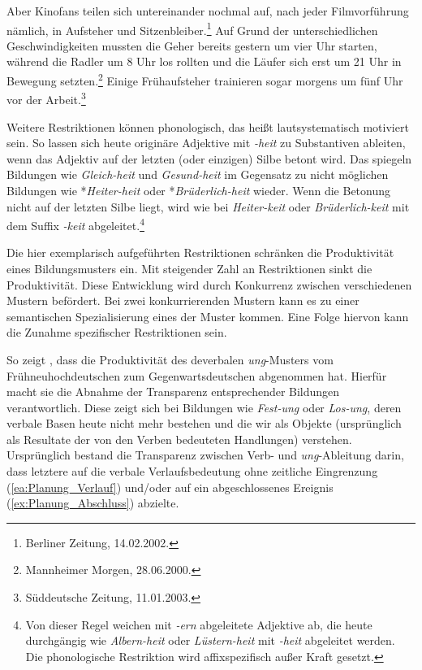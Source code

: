 \ea \label{ea:pragmatische_Restriktion}
\ea \label{ea:Aufsteher} Aber Kinofans teilen sich untereinander nochmal auf, nach jeder Filmvorführung nämlich, in Aufsteher und Sitzenbleiber.\footnote{Berliner Zeitung, 14.02.2002.}
\ex \label{ex:Geher} Auf Grund der unterschiedlichen Geschwindigkeiten mussten die Geher bereits gestern um vier Uhr starten, während die Radler um 8 Uhr los rollten und die Läufer sich erst um 21 Uhr in Bewegung setzten.\footnote{Mannheimer Morgen, 28.06.2000.}
\ex \label{ex:Frühaufsteher} Einige Frühaufsteher trainieren sogar morgens um fünf Uhr vor der Arbeit.\footnote{
Süddeutsche Zeitung, 11.01.2003.}
\z 
\z 

Weitere Restriktionen können phonologisch, das heißt lautsystematisch motiviert sein. So lassen sich heute \zB originäre Adjektive mit \textit{-heit} zu Substantiven ableiten, wenn das Adjektiv auf der letzten (oder einzigen) Silbe betont wird. Das spiegeln Bildungen wie \textit{Gleich-heit} und \textit{Gesund-heit} im Gegensatz zu nicht möglichen Bildungen wie *\textit{Heiter-heit} oder *\textit{Brüderlich-heit} wieder. Wenn die Betonung nicht auf der letzten Silbe liegt, wird wie bei \textit{Heiter-keit} oder \textit{Brüderlich-keit} mit dem Suffix \textit{-keit} abgeleitet.\footnote{Von dieser Regel weichen mit \textit{-ern} abgeleitete Adjektive ab, die heute durchgängig wie \textit{Albern-heit} oder \textit{Lüstern-heit} mit \textit{-heit} abgeleitet werden. Die phonologische Restriktion wird affixspezifisch außer Kraft gesetzt.}

Die hier exemplarisch aufgeführten Restriktionen schränken die Produktivität eines Bildungsmusters ein. Mit steigender Zahl an Restriktionen sinkt die Produktivität. Diese Entwicklung wird durch Konkurrenz zwischen verschiedenen Mustern befördert. Bei zwei konkurrierenden Mustern kann es zu einer semantischen Spezialisierung eines der Muster kommen. Eine Folge hiervon kann die Zunahme spezifischer Restriktionen sein. 

So zeigt \citet[396--397]{Demske2000}, dass die Produktivität des deverbalen \textit{ung}-Musters vom Frühneuhochdeutschen zum Gegenwartsdeutschen abgenommen hat. Hierfür macht sie die Abnahme der Transparenz entsprechender Bildungen verantwortlich. Diese zeigt sich \ua bei Bildungen wie \textit{Fest-ung} oder \textit{Los-ung}, deren verbale Basen heute nicht mehr bestehen und die wir als Objekte (ursprünglich als Resultate der von den Verben bedeuteten Handlungen) verstehen. Ursprünglich bestand die Transparenz zwischen Verb- und \textit{ung}-Ableitung darin, dass letztere auf die verbale Verlaufsbedeutung ohne zeitliche Eingrenzung (\ref{ea:Planung_Verlauf}) und/oder auf ein abgeschlossenes Ereignis (\ref{ex:Planung_Abschluss}) abzielte.   

